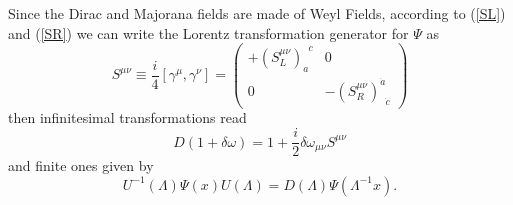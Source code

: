 
Since the Dirac and Majorana fields are made of Weyl Fields, according to (\ref{SL}) and (\ref{SR}) we can write the Lorentz transformation generator for $\Psi$ as
\begin{equation}
 S^{\mu \nu}\equiv\frac{i}{4}\left[\gamma^{\mu}, \gamma^{\nu}\right]=\left(\begin{array}{cc}
+\left(S_{{L}}^{\mu \nu}\right)_{a}^{\phantom{a}c}& 0 \\
0 & -\left(S_{{R}}^{\mu \nu}\right)^{\dot{a}}_{\phantom{a}\dot{c}}
\end{array}\right) 
\end{equation}
then infinitesimal transformations read
\begin{equation}
D(1+\delta \omega)=1+\frac{i}{2} \delta \omega_{\mu \nu} S^{\mu \nu}
\end{equation}
and finite ones given by
\begin{equation}
U^{-1}(\Lambda) \Psi(x) U(\Lambda)=D(\Lambda) \Psi\left(\Lambda^{-1} x\right).
\end{equation}
